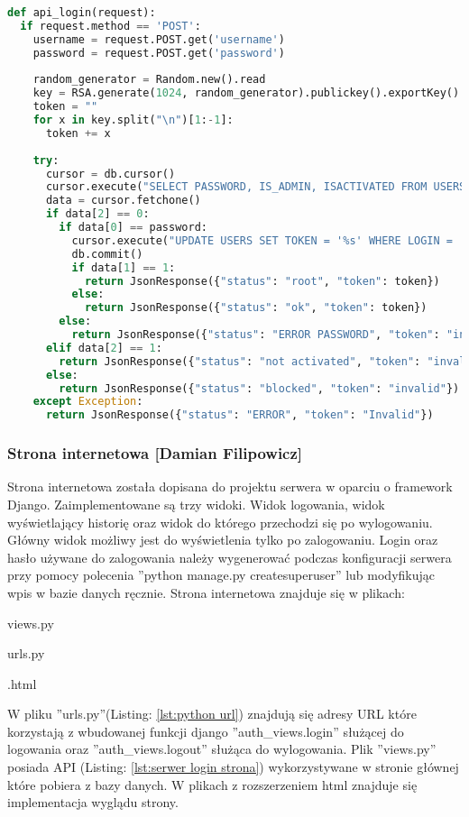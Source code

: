 \documentclass[twoside,10pt]{article}
\def\StudentB     {Damian Filipowicz}
\begin{document}
{\footnotesize 
\begin{lstlisting}[caption={API logowania}, label={lst:serwer login}, language=Python]
def api_login(request):
  if request.method == 'POST':
    username = request.POST.get('username')
    password = request.POST.get('password')
    
    random_generator = Random.new().read
    key = RSA.generate(1024, random_generator).publickey().exportKey()
    token = ""
    for x in key.split("\n")[1:-1]:
      token += x
    
    try:
      cursor = db.cursor()
      cursor.execute("SELECT PASSWORD, IS_ADMIN, ISACTIVATED FROM USERS WHERE login='%s'" % username)
      data = cursor.fetchone()
      if data[2] == 0:
        if data[0] == password:
          cursor.execute("UPDATE USERS SET TOKEN = '%s' WHERE LOGIN = '%s'" % (token, username))
          db.commit()
          if data[1] == 1:
            return JsonResponse({"status": "root", "token": token})
          else:
            return JsonResponse({"status": "ok", "token": token})
        else:
          return JsonResponse({"status": "ERROR PASSWORD", "token": "invalid"})
      elif data[2] == 1:
        return JsonResponse({"status": "not activated", "token": "invalid"})
      else:
        return JsonResponse({"status": "blocked", "token": "invalid"})
    except Exception:
      return JsonResponse({"status": "ERROR", "token": "Invalid"})
\end{lstlisting}}

\subsubsection{Strona internetowa [\StudentB]}
Strona internetowa została dopisana do projektu serwera w oparciu o framework Django. Zaimplementowane są trzy widoki. Widok logowania, widok wyświetlający historię oraz widok do którego przechodzi się po wylogowaniu. Główny widok możliwy jest do wyświetlenia tylko po zalogowaniu. Login oraz hasło używane do zalogowania należy wygenerować podczas konfiguracji serwera przy pomocy polecenia ''python manage.py createsuperuser'' lub modyfikując wpis w bazie danych ręcznie. Strona internetowa znajduje się w plikach:
\begin{itemize*}
\item views.py
\item urls.py
\item *.html
\end{itemize*}

W pliku ''urls.py''(Listing: \ref{lst:python url}) znajdują się adresy URL które korzystają z wbudowanej funkcji django ''auth\_views.login'' służącej do logowania oraz ''auth\_views.logout'' służąca do wylogowania. Plik ''views.py'' posiada API (Listing: \ref{lst:serwer login strona}) wykorzystywane w stronie głównej które pobiera z bazy danych. W plikach z rozszerzeniem html znajduje się implementacja wyglądu strony.
\end{document}
